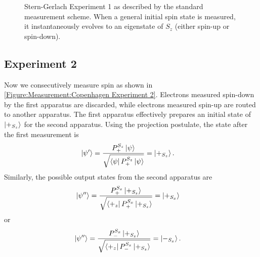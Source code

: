 \begin{figure}
\centering\CaptionFontSize
{}

\caption[Standard approach to Stern-Gerlach Experiment 1]
{Stern-Gerlach Experiment 1 as described by the standard measurement scheme. When a general initial spin state is measured, it instantaneously evolves to an eigenstate of $S_z$ (either spin-up or spin-down). }
\label{Figure:Measurement:Copenhagen Experiment 1}
\end{figure}

\subsection{Experiment 2} \label{standard consecutive measurements}
Now we consecutively measure spin as shown in \autoref{Figure:Measurement:Copenhagen Experiment 2}. Electrons measured spin-down by the first apparatus are discarded, while electrons measured spin-up are routed to another apparatus. The first apparatus effectively prepares an initial state of $\ket{+_{S_z}}$ for the second apparatus. Using the projection postulate, the state after the first measurement is
\begin{align}
    \ket{\psi^\prime} &= \frac{{P^{S_z}_+}\ket{\psi}}{\sqrt{\bra{\psi}P^{S_z}_+\ket{\psi}}} = \ket{+_{S_z}}.
\end{align}
Similarly, the possible output states from the second apparatus are
\begin{align}
  \ket{\psi^{\prime\prime}} &= \frac{P^{S_x}_+\ket{+_{S_z}}}{\sqrt{\bra{+_z}P^{S_x}_+\ket{+_{S_z}}}} = \ket{+_{S_x}}
\end{align}
or
\begin{align}
  \ket{\psi^{\prime\prime}} &= \frac{P^{S_x}_-\ket{+_{S_z}}}{\sqrt{\bra{+_z}P^{S_x}_-\ket{+_{S_z}}}} = \ket{-_{S_x}}.
\end{align}

